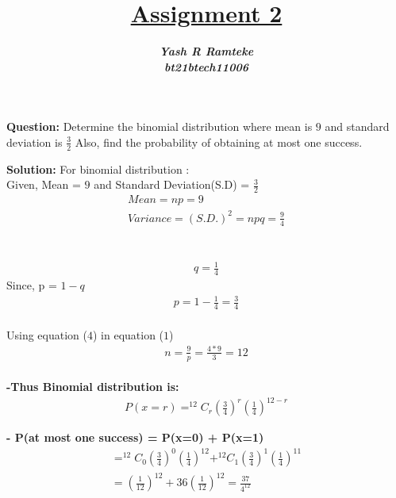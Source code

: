 \documentclass[journal,12pt,twocolumn]{IEEEtran}
\title{\textbf{\underline{Assignment 2}}}
\author{\textbf{\textit{Yash R Ramteke}}\\
\textbf{\textit{bt21btech11006}}}
\begin{document}
\maketitle

\textbf{Question:}
Determine the binomial distribution where mean is $9$ and standard deviation is $\frac{3}{2}$ Also, find the probability of obtaining at most one success.

\bigskip
\textbf{Solution:}
For binomial distribution :\\
Given, Mean = $9$ and Standard Deviation(S.D) = $\frac{3}{2}$ 
\begin{align}
Mean = np = 9 \\
Variance = (S.D.)^{2} = npq =  \frac{9}{4} 
\end{align}\\
\\
\begin{align}
q = \frac{1}{4}
\end{align}
Since, p = $1 - q$
\begin{align}
p = 1 - \frac{1}{4} = \frac{3}{4} 
\end{align}\\
Using equation ($4$) in equation ($1$)
\begin{align}
n = \frac{9}{p} = \frac{4 * 9}{3} = 12
\end{align}\\
\textbf{-Thus Binomial distribution is:} 
\begin{align*}
P(x=r) = ^{12}C_r (\frac{3}{4})^r (\frac{1}{4})^{12-r}
\end{align*}

\begin{center}
\end{center}
\textbf{- P(at most one success) = P(x=0) + P(x=1)}\\
\begin{align*}
=  ^{12}C_0 (\frac{3}{4})^0 (\frac{1}{4})^{12} + ^{12}C_1 (\frac{3}{4})^1 (\frac{1}{4})^{11} \\
= (\frac{1}{12})^{12} + 36(\frac{1}{12})^{12} = \frac{37}{4^{12}}
\end{align*}
\end{document}
